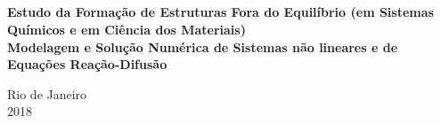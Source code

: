 \begin{titlepage}
\begin{center}
  \hspace{2cm}\large{}\\
  \hspace{2cm}\large{}\\
  \hspace{2cm}\large{}\\
  \hspace{2cm}\large{}\\


  \par
  {\large\textbf{Estudo da Formação de Estruturas Fora do Equilíbrio (em Sistemas Químicos e em Ciência dos Materiais)\\ \textcolor{red!}{Modelagem e Solução Numérica de Sistemas não lineares e de Equações Reação-Difusão}}}%


  \par\vfill
  Rio de Janeiro\\2018

\end{center}
\end{titlepage}